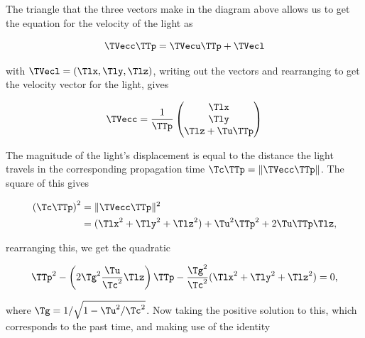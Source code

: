 \begin{derivation}

	The triangle that the three vectors make in the diagram above allows us to get the equation for the velocity of the light as

	\begin{equation}
		\TVecc  \TTp  = \TVecu  \TTp  + \TVecl
	\end{equation}

	with $\TVecl =(\Tlx ,\Tly ,\Tlz )$, writing out the vectors and rearranging to get the velocity vector for the light, gives

	\begin{equation}
		\label{eq: retarded light velocity vector}
		\TVecc  = \frac{1}{\TTp }
		\begin{pmatrix}
			\Tlx  \\
			\Tly  \\
			\Tlz  + \Tu  \TTp
		\end{pmatrix}
	\end{equation}

	The magnitude of the light's displacement is equal to the distance the light travels in the corresponding propagation time $ \Tc  \TTp  = \|\TVecc  \TTp \|$.
	The square of this gives

	\begin{equation}
		\begin{aligned}
			\left( \Tc  \TTp \right)^2 & = \|\TVecc  \TTp \|^2                                     \\
			                      & = (\Tlx ^2 + \Tly ^2 + \Tlz ^2) + \Tu ^2 \TTp ^2 + 2\Tu  \TTp  \Tlz ,
		\end{aligned}
	\end{equation}

	rearranging this, we get the quadratic

	\begin{equation}
		\TTp ^2 - \left(2\Tg ^2\frac{\Tu }{\Tc ^2} \Tlz \right)\TTp  - \frac{\Tg ^2}{\Tc ^2}(\Tlx ^2 + \Tly ^2 + \Tlz ^2) = 0,
	\end{equation}

	where $\Tg  = 1/ \sqrt{1 - \Tu ^2/\Tc ^2}$.
	Now taking the positive solution to this, which corresponds to the past time, and making use of the identity


\end{derivation}
